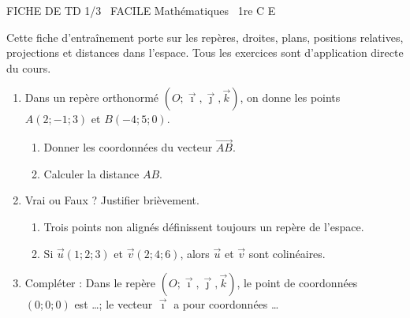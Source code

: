 \documentclass[11pt]{article}
\begin{document}
\pagestyle{empty}

\begin{tcolorbox}[enhanced,colback=popink,colframe=popink,arc=10pt,boxrule=0pt,left=12pt,right=12pt,top=9pt,bottom=9pt]
{\color{white}\popxbold\small FICHE DE TD 1/3 \textbullet\ FACILE \hfill Mathématiques \textbullet\ 1re C E\par}
\end{tcolorbox}
\vspace{4pt}

\noindent Cette fiche d'entraînement porte sur les repères, droites, plans, positions relatives, projections et distances dans l'espace. Tous les exercices sont d'application directe du cours.

\begin{exercice}
\begin{enumerate}
    \item Dans un repère orthonormé $(O;\vec{\imath},\vec{\jmath},\vec{k})$, on donne les points $A(2;-1;3)$ et $B(-4;5;0)$.
    \begin{enumerate}
        \item Donner les coordonnées du vecteur $\overrightarrow{AB}$.
        \item Calculer la distance $AB$.
    \end{enumerate}
    \item Vrai ou Faux ? Justifier brièvement.
    \begin{enumerate}
        \item Trois points non alignés définissent toujours un repère de l'espace.
        \item Si $\vec{u}(1;2;3)$ et $\vec{v}(2;4;6)$, alors $\vec{u}$ et $\vec{v}$ sont colinéaires.
    \end{enumerate}
    \item Compléter : Dans le repère $(O;\vec{\imath},\vec{\jmath},\vec{k})$, le point de coordonnées $(0;0;0)$ est \ldots ; le vecteur $\vec{\imath}$ a pour coordonnées \ldots
\end{enumerate}
\end{exercice}
\end{document}
